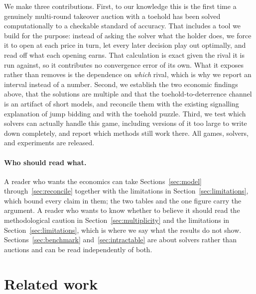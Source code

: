 \documentclass[11pt,a4paper]{article}
\begin{document}
We make three contributions. First, to our knowledge this is the first time a genuinely multi-round takeover auction with a toehold has been solved computationally to a checkable standard of accuracy. That includes a tool we build for the purpose: instead of asking the solver what the holder does, we force it to open at each price in turn, let every later decision play out optimally, and read off what each opening earns. That calculation is exact given the rival it is run against, so it contributes no convergence error of its own. What it exposes rather than removes is the dependence on \emph{which} rival, which is why we report an interval instead of a number. Second, we establish the two economic findings above, that the solutions are multiple and that the toehold-to-deterrence channel is an artifact of short models, and reconcile them with the existing signalling explanation of jump bidding \citep{fishman1988} and with the toehold puzzle. Third, we test which solvers can actually handle this game, including versions of it too large to write down completely, and report which methods still work there. All games, solvers, and experiments are released.

\paragraph{Who should read what.} A reader who wants the economics can take Sections~\ref{sec:model} through~\ref{sec:reconcile} together with the limitations in Section~\ref{sec:limitations}, which bound every claim in them; the two tables and the one figure carry the argument. A reader who wants to know whether to believe it should read the methodological caution in Section~\ref{sec:multiplicity} and the limitations in Section~\ref{sec:limitations}, which is where we say what the results do not show. Sections~\ref{sec:benchmark} and~\ref{sec:intractable} are about solvers rather than auctions and can be read independently of both.

\section{Related work}
\end{document}
